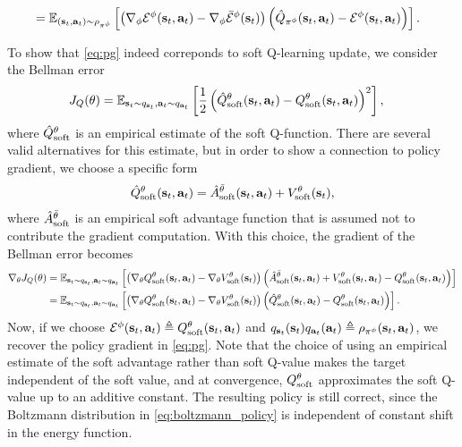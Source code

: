 \begin{align}
&=\operatorname{\mathbb{E}}_{({\mathbf{s}_t}, {\mathbf{a}_t})\sim\rho_{\pi^\phi}}\left[\left(\nabla_\phi\mathcal{E}^\phi({\mathbf{s}_t}, {\mathbf{a}_t}) - \nabla_\phi\bar{\mathcal{E}}^\phi({\mathbf{s}_t})\right)\left(\hat{Q}_{\pi^\phi}({\mathbf{s}_t}, {\mathbf{a}_t}) - \mathcal{E}^\phi({\mathbf{s}_t}, {\mathbf{a}_t})\right)\right].
\label{eq:pg}
\end{align}

To show that \autoref{eq:pg} indeed correponds to soft Q-learning update, we consider the Bellman error
\begin{align}
J_Q({\theta}) &= \operatorname{\mathbb{E}}_{{\mathbf{s}_t}\sim q_{\mathbf{s}_t}, {\mathbf{a}_t} \sim q_{\mathbf{a}_t}}\left[\frac{1}{2}\left(\hat Q_\mathrm{soft}^{\theta}({\mathbf{s}_t}, {\mathbf{a}_t})- Q_\mathrm{soft}^{\theta}({\mathbf{s}_t}, {\mathbf{a}_t})\right)^2\right],
\end{align}
where $\hat Q_\mathrm{soft}^{\theta}$ is an empirical estimate of the soft Q-function. There are several valid alternatives for this estimate, but in order to show a connection to policy gradient, we choose a specific form
\begin{align}
\hat Q_\mathrm{soft}^{\theta}({\mathbf{s}_t}, {\mathbf{a}_t}) = \hat A_\mathrm{soft}^{\bar\theta}({\mathbf{s}_t}, {\mathbf{a}_t}) + V_\mathrm{soft}^{\theta}({\mathbf{s}_t}),
\end{align}
where $\hat A_\mathrm{soft}^{\bar\theta}$ is an  empirical soft advantage function that is assumed not to contribute the gradient computation. With this choice, the gradient of the Bellman error becomes
\begin{align}
\nabla_{\theta}J_Q({\theta}) &= \operatorname{\mathbb{E}}_{{\mathbf{s}_t}\sim q_{\mathbf{s}_t}, {\mathbf{a}_t}\sim q_{\mathbf{a}_t}}\left[\left(\nabla_\theta Q_\mathrm{soft}^{\theta}({\mathbf{s}_t}, {\mathbf{a}_t}) - \nabla_{\theta}V_\mathrm{soft}^{\theta}({\mathbf{s}_t})\right)\left(\hat A_\mathrm{soft}^{\bar\theta}({\mathbf{s}_t}, {\mathbf{a}_t}) + V_\mathrm{soft}^{\theta}({\mathbf{s}_t},{\mathbf{a}_t}) - Q_\mathrm{soft}^{\theta}({\mathbf{s}_t}, {\mathbf{a}_t}) \right)\right]\notag\\
&= \operatorname{\mathbb{E}}_{{\mathbf{s}_t}\sim q_{\mathbf{s}_t}, {\mathbf{a}_t}\sim q_{\mathbf{a}_t}}\left[\left(\nabla_\theta Q_\mathrm{soft}^{\theta}({\mathbf{s}_t}, {\mathbf{a}_t}) - \nabla_{\theta}V_\mathrm{soft}^{\theta}({\mathbf{s}_t})\right)\left(\hat Q_\mathrm{soft}^{\theta}({\mathbf{s}_t}, {\mathbf{a}_t}) - Q_\mathrm{soft}^{\theta}({\mathbf{s}_t}, {\mathbf{a}_t})\right)\right].
\label{eq:advantage_gradient}
\end{align}
Now, if we choose $\mathcal{E}^\phi({\mathbf{s}_t}, {\mathbf{a}_t}) \triangleq Q_\mathrm{soft}^{\theta}({\mathbf{s}_t}, {\mathbf{a}_t})$ and $q_{\mathbf{s}_t}({\mathbf{s}_t}) q_{\mathbf{a}_t}({\mathbf{a}_t}) \triangleq\rho_{\pi^\phi}({\mathbf{s}_t}, {\mathbf{a}_t})$, we recover the policy gradient in \autoref{eq:pg}. Note that the choice of using an empirical estimate of the soft advantage rather than soft Q-value makes the target independent of the soft value, and at convergence, $Q_\mathrm{soft}^{\theta}$ approximates the soft Q-value up to an additive constant. The resulting policy is still correct, since the Boltzmann distribution in \autoref{eq:boltzmann_policy} is independent of constant shift in the energy function.










